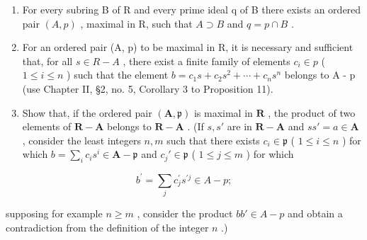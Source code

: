 \begin{enumerate}
\def\labelenumi{(\alph{enumi})}
\item
  For every subring B of R and every prime ideal q of B there exists an ordered pair \((A, p)\) , maximal in R, such that \(A \supset B\) and \(q = p \cap B\) .
\item
  For an ordered pair (A, p) to be maximal in R, it is necessary and sufficient that, for all \(s \in R - A\) , there exist a finite family of elements \(c_{i} \in p\) ( \(1 \leqslant i \leqslant n\) ) such that the element \(b = c_{1}s + c_{2}s^{2} + \cdots + c_{n}s^{n}\) belongs to A - p (use Chapter II, §2, no. 5, Corollary 3 to Proposition 11).
\item
  Show that, if the ordered pair \((\mathbf{A},\mathfrak{p})\) is maximal in \(\mathbf{R}\) , the product of two elements of \(\mathbf{R} - \mathbf{A}\) belongs to \(\mathbf{R} - \mathbf{A}\) . (If \(s,s'\) are in \(\mathbf{R} - \mathbf{A}\) and \(ss' = a\in \mathbf{A}\) , consider the least integers \(n,m\) such that there exists \(c_{i}\in \mathfrak{p}\) ( \(1\leqslant i\leqslant n\) ) for which \(b = \sum_{i}c_{i}s^{i}\in \mathbf{A} - \mathfrak{p}\) and \(c_{j}'\in \mathfrak{p}\) ( \(1\leqslant j\leqslant m\) ) for which
\end{enumerate}

\[
b ^ {\prime} = \sum_ {j} c _ {j} ^ {\prime} s ^ {\prime j} \in A - p;
\]

supposing for example \(n \geqslant m\) , consider the product \(bb' \in A - p\) and obtain a contradiction from the definition of the integer \(n\) .)

